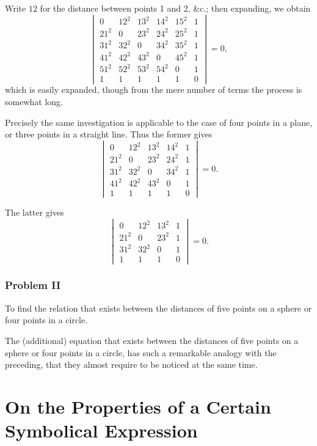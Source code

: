 \documentclass[11pt,a4paper]{book}
\begin{document}
\noindent
Write $12$ for the distance between points 1 and 2, \&c.; then expanding, we obtain
\[
\begin{vmatrix}
0 & 12^2 & 13^2 & 14^2 & 15^2 & 1 \\
21^2 & 0 & 23^2 & 24^2 & 25^2 & 1 \\
31^2 & 32^2 & 0 & 34^2 & 35^2 & 1 \\
41^2 & 42^2 & 43^2 & 0 & 45^2 & 1 \\
51^2 & 52^2 & 53^2 & 54^2 & 0 & 1 \\
1 & 1 & 1 & 1 & 1 & 0
\end{vmatrix} = 0,
\]
which is easily expanded, though from the mere number of terms the process is somewhat long.

Precisely the same investigation is applicable to the case of four points in a plane, or three points in a straight line. Thus the former gives
\[
\begin{vmatrix}
0 & 12^2 & 13^2 & 14^2 & 1 \\
21^2 & 0 & 23^2 & 24^2 & 1 \\
31^2 & 32^2 & 0 & 34^2 & 1 \\
41^2 & 42^2 & 43^2 & 0 & 1 \\
1 & 1 & 1 & 1 & 0
\end{vmatrix} = 0.
\]

The latter gives
\[
\begin{vmatrix}
0 & 12^2 & 13^2 & 1 \\
21^2 & 0 & 23^2 & 1 \\
31^2 & 32^2 & 0 & 1 \\
1 & 1 & 1 & 0
\end{vmatrix} = 0.
\]

\subsection*{Problem II}

To find the relation that exists between the distances of five points on a sphere or four points in a circle.

The (additional) equation that exists between the distances of five points on a sphere or four points in a circle, has such a remarkable analogy with the preceding, that they almost require to be noticed at the same time.

\cleardoublepage

\chapter{On the Properties of a Certain Symbolical Expression}
\label{chap:paper2}
\end{document}
